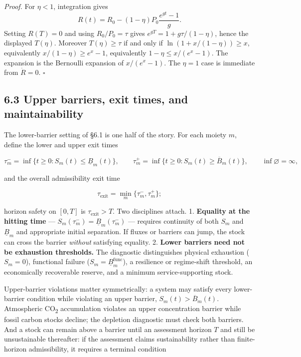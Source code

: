 \documentclass[11pt]{article}
\begin{document}
\emph{Proof.} For \(\eta<1\), integration gives
$$R(t)=R_0-(1-\eta)P_0\frac{e^{gt}-1}{g}.$$
Setting \(R(T)=0\) and using \(R_0/P_0=\tau\) gives \(e^{gT}=1+g\tau/(1-\eta)\), hence the displayed \(T(\eta)\). Moreover \(T(\eta)\ge\tau\) if and only if \(\ln(1+x/(1-\eta))\ge x\), equivalently \(x/(1-\eta)\ge e^x-1\), equivalently \(1-\eta\le x/(e^x-1)\). The expansion is the Bernoulli expansion of \(x/(e^x-1)\). The \(\eta=1\) case is immediate from \(\dot R=0\). \(\square\)

\subsection*{6.3 Upper barriers, exit times, and maintainability}\label{63-upper-barriers-exit-times-and-maintainability}

The lower-barrier setting of \S6.1 is one half of the story. For each moiety \(m\), define the lower and upper exit times 

$$\tau_m^- = \inf\{ t \ge 0 : S_m(t) \le \underline{B}_m(t) \}, \qquad \tau_m^+ = \inf\{ t \ge 0 : S_m(t) \ge \overline{B}_m(t) \}, \qquad \inf\varnothing = \infty,$$

 and the overall admissibility exit time 

$$\tau_{\mathrm{exit}} = \min_m \{ \tau_m^-, \tau_m^+ \};$$

 horizon safety on \([0,T]\) is \(\tau_{\mathrm{exit}} > T\). Two disciplines attach. 1. \textbf{Equality at the hitting time} --- \(S_m(\tau_m^-)=\allowbreak{}\underline B_m(\tau_m^-)\) --- requires continuity of both \(S_m\) and \(\underline B_m\) and appropriate initial separation. If fluxes or barriers can jump, the stock can cross the barrier \emph{without} satisfying equality. 2. \textbf{Lower barriers need not be exhaustion thresholds.} The diagnostic distinguishes physical exhaustion (\(S_m=0\)), functional failure (\(S_m=\allowbreak{}\underline B_m^{\mathrm{func}}\)), a resilience or regime-shift threshold, an economically recoverable reserve, and a minimum service-supporting stock.

Upper-barrier violations matter symmetrically: a system may satisfy every lower-barrier condition while violating an upper barrier, \(S_m(t) > \overline{B}_m(t)\). Atmospheric CO\textsubscript{2} accumulation violates an upper concentration barrier while fossil carbon stocks decline; the depletion diagnostic must check both barriers. And a stock can remain above a barrier until an assessment horizon \(T\) and still be unsustainable thereafter: if the assessment claims sustainability rather than finite-horizon admissibility, it requires a terminal condition 
\end{document}
